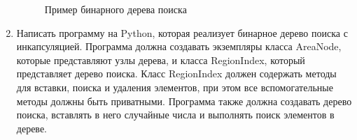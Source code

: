 \begin{enumerate}
\begin{figure}[h]
\centering
{}
\caption{Пример бинарного дерева поиска}
\end{figure}

\item Написать программу на Python, которая реализует бинарное дерево поиска с инкапсуляцией. Программа должна создавать экземпляры класса AreaNode, которые представляют узлы дерева, и класса RegionIndex, который представляет дерево поиска. Класс RegionIndex должен содержать методы для вставки, поиска и удаления элементов, при этом все вспомогательные методы должны быть приватными. Программа также должна создавать дерево поиска, вставлять в него случайные числа и выполнять поиск элементов в дереве.


\end{enumerate}
